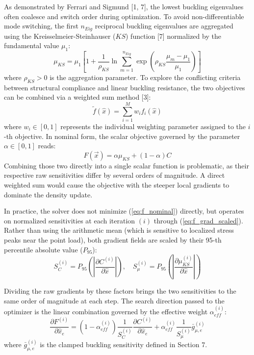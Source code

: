 \documentclass{article}
\begin{document}
As demonstrated by Ferrari and Sigmund [1, 7], the lowest buckling eigenvalues often coalesce and switch order during optimization. To avoid non-differentiable mode switching, the first $n_{Eig}$ reciprocal buckling eigenvalues are aggregated using the Kreisselmeier-Steinhauser ($KS$) function [7] normalized by the fundamental value $\mu_1$:
\begin{equation}\label{eq:mu_ks}
\mu_{KS} = \mu_1 \left[ 1 + \frac{1}{\rho_{KS}} \ln \sum_{m=1}^{n_{Eig}} \exp\left(\rho_{KS}\frac{\mu_m - \mu_1}{\mu_1}\right) \right]
\end{equation}
where $\rho_{KS} > 0$ is the aggregation parameter. To explore the conflicting criteria between structural compliance and linear buckling resistance, the two objectives can be combined via a weighted sum method [3]:
\begin{equation}\label{eq:wsum_gen}
\tilde{f}(\hat{x}) = \sum_{i=1}^M w_i f_i(\hat{x})
\end{equation}
where $w_i \in [0, 1]$ represents the individual weighting parameter assigned to the $i$-th objective. In nominal form, the scalar objective governed by the parameter $\alpha \in [0, 1]$ reads:
\begin{equation}\label{eq:f_nominal}
F(\vec{x}) = \alpha \mu_{KS} + (1 - \alpha)C
\end{equation}
\noindent Combining those two directly into a single scalar function is problematic, as their respective raw sensitivities differ by several orders of magnitude. A direct weighted sum would cause the objective with the steeper local gradients to dominate the density update.

In practice, the solver does not minimize (\ref{eq:f_nominal}) directly, but operates on normalized sensitivities at each iteration $(i)$ through (\ref{eq:f_grad_scaled}). Rather than using the arithmetic mean (which is sensitive to localized stress peaks near the point load), both gradient fields are scaled by their 95-th percentile absolute value ($P_{95}$):
\begin{equation}\label{eq:s_p95}
S_C^{(i)} = P_{95}\left(\left| \frac{\partial C^{(i)}}{\partial \hat{x}} \right|\right), \quad S_\mu^{(i)} = P_{95}\left(\left| \frac{\partial \mu_{KS}^{(i)}}{\partial \hat{x}} \right|\right)
\end{equation}

Dividing the raw gradients by these factors brings the two sensitivities to the same order of magnitude at each step. The search direction passed to the optimizer is the linear combination governed by the effective weight $\alpha_{eff}^{(i)}$:
\begin{equation}\label{eq:f_grad_scaled}
\frac{\partial F^{(i)}}{\partial \hat{x}_e} = (1 - \alpha_{eff}^{(i)})\frac{1}{S_C^{(i)}}\frac{\partial C^{(i)}}{\partial \hat{x}_e} + \alpha_{eff}^{(i)} \frac{1}{S_\mu^{(i)}}\bar{g}_{\mu, e}^{(i)}
\end{equation}
where $\bar{g}_{\mu, e}^{(i)}$ is the clamped buckling sensitivity defined in Section 7.
\end{document}
